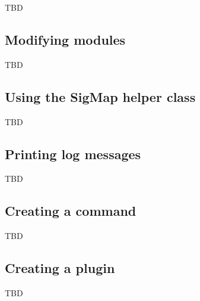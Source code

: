 \begin{frame}{\subsecname}
TBD
\end{frame}


\subsection{Modifying modules}

\begin{frame}{\subsecname}
TBD
\end{frame}


\subsection{Using the SigMap helper class}

\begin{frame}{\subsecname}
TBD
\end{frame}


\subsection{Printing log messages}

\begin{frame}{\subsecname}
TBD
\end{frame}


\subsection{Creating a command}

\begin{frame}{\subsecname}
TBD
\end{frame}


\subsection{Creating a plugin}

\begin{frame}{\subsecname}
TBD
\end{frame}


